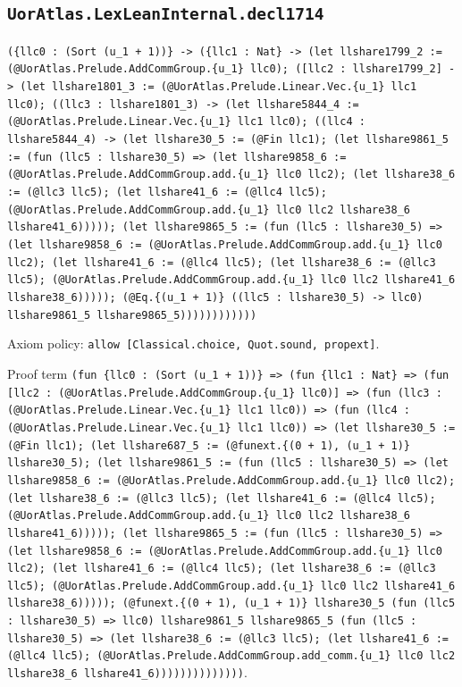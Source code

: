 \documentclass[11pt]{article}
\begin{document}
\subsection*{\texttt{UorAtlas.LexLeanInternal.decl1714}}
\noindent\texttt{(\{llc0 : (Sort (u\_1 + 1))\} -> (\{llc1 : Nat\} -> (let llshare1799\_2 := (@UorAtlas.Prelude.AddCommGroup.\{u\_1\} llc0); ([llc2 : llshare1799\_2] -> (let llshare1801\_3 := (@UorAtlas.Prelude.Linear.Vec.\{u\_1\} llc1 llc0); ((llc3 : llshare1801\_3) -> (let llshare5844\_4 := (@UorAtlas.Prelude.Linear.Vec.\{u\_1\} llc1 llc0); ((llc4 : llshare5844\_4) -> (let llshare30\_5 := (@Fin llc1); (let llshare9861\_5 := (fun (llc5 : llshare30\_5) => (let llshare9858\_6 := (@UorAtlas.Prelude.AddCommGroup.add.\{u\_1\} llc0 llc2); (let llshare38\_6 := (@llc3 llc5); (let llshare41\_6 := (@llc4 llc5); (@UorAtlas.Prelude.AddCommGroup.add.\{u\_1\} llc0 llc2 llshare38\_6 llshare41\_6))))); (let llshare9865\_5 := (fun (llc5 : llshare30\_5) => (let llshare9858\_6 := (@UorAtlas.Prelude.AddCommGroup.add.\{u\_1\} llc0 llc2); (let llshare41\_6 := (@llc4 llc5); (let llshare38\_6 := (@llc3 llc5); (@UorAtlas.Prelude.AddCommGroup.add.\{u\_1\} llc0 llc2 llshare41\_6 llshare38\_6))))); (@Eq.\{(u\_1 + 1)\} ((llc5 : llshare30\_5) -> llc0) llshare9861\_5 llshare9865\_5))))))))))))}\par
\noindent Axiom policy: \texttt{allow [Classical.choice, Quot.sound, propext]}.\par
\noindent Proof term \texttt{(fun \{llc0 : (Sort (u\_1 + 1))\} => (fun \{llc1 : Nat\} => (fun [llc2 : (@UorAtlas.Prelude.AddCommGroup.\{u\_1\} llc0)] => (fun (llc3 : (@UorAtlas.Prelude.Linear.Vec.\{u\_1\} llc1 llc0)) => (fun (llc4 : (@UorAtlas.Prelude.Linear.Vec.\{u\_1\} llc1 llc0)) => (let llshare30\_5 := (@Fin llc1); (let llshare687\_5 := (@funext.\{(0 + 1), (u\_1 + 1)\} llshare30\_5); (let llshare9861\_5 := (fun (llc5 : llshare30\_5) => (let llshare9858\_6 := (@UorAtlas.Prelude.AddCommGroup.add.\{u\_1\} llc0 llc2); (let llshare38\_6 := (@llc3 llc5); (let llshare41\_6 := (@llc4 llc5); (@UorAtlas.Prelude.AddCommGroup.add.\{u\_1\} llc0 llc2 llshare38\_6 llshare41\_6))))); (let llshare9865\_5 := (fun (llc5 : llshare30\_5) => (let llshare9858\_6 := (@UorAtlas.Prelude.AddCommGroup.add.\{u\_1\} llc0 llc2); (let llshare41\_6 := (@llc4 llc5); (let llshare38\_6 := (@llc3 llc5); (@UorAtlas.Prelude.AddCommGroup.add.\{u\_1\} llc0 llc2 llshare41\_6 llshare38\_6))))); (@funext.\{(0 + 1), (u\_1 + 1)\} llshare30\_5 (fun (llc5 : llshare30\_5) => llc0) llshare9861\_5 llshare9865\_5 (fun (llc5 : llshare30\_5) => (let llshare38\_6 := (@llc3 llc5); (let llshare41\_6 := (@llc4 llc5); (@UorAtlas.Prelude.AddCommGroup.add\_comm.\{u\_1\} llc0 llc2 llshare38\_6 llshare41\_6))))))))))))))}.\par
\end{document}
